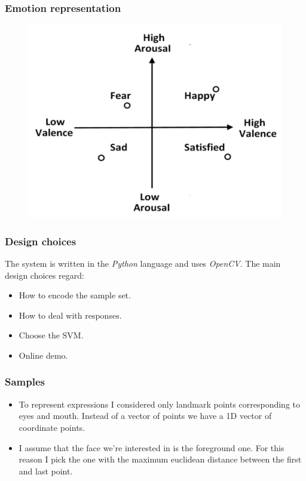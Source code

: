 \documentclass{beamer}
\begin{document}
\begin{frame}
    \frametitle{Emotion representation}
    \begin{figure}
        \centering
        \includegraphics[scale=0.3]{../paper/images/emotion-classification.png}
    \end{figure}
\end{frame}

\begin{frame}
    \frametitle{Design choices}
    The system is written in the \textit{Python} language and uses \textit{OpenCV}.
    The main design choices regard:
    \begin{itemize}
        \item How to encode the sample set.
        \item How to deal with responses.
        \item Choose the SVM.
        \item Online demo.
    \end{itemize}
\end{frame}

\begin{frame}
    \frametitle{Samples}
    \begin{itemize}
        \item To represent expressions I considered only landmark points corresponding to eyes and mouth.
        Instead of a vector of points we have a 1D vector of coordinate points.
        
        \item I assume that the face we're interested in is the foreground one. For this reason I pick the one with the maximum euclidean distance between the first and last point.
    \end{itemize}
\end{frame}
\end{document}
